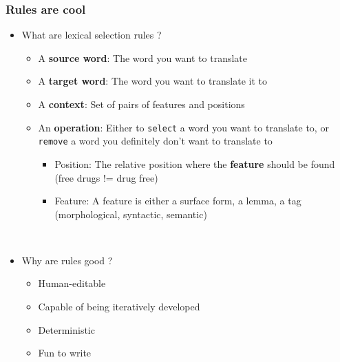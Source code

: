 \documentclass[10pt,xetex]{beamer} %
\begin{document}
\begin{frame}
\frametitle{Rules are cool}

\begin{itemize}
  \item What are lexical selection rules ?
  \begin{itemize}
    \item A {\bf source word}: The word you want to translate
    \item A {\bf target word}: The word you want to translate it to
    \item A {\bf context}: Set of pairs of features and positions
    \item An {\bf operation}: Either to {\tt select} a word you want to translate to, or {\tt remove} a word you definitely don't want to translate to
    \begin{itemize}
      \item  Position: The relative position where the {\bf feature} should be found (free drugs != drug free)
      \item  Feature: A feature is either a surface form, a lemma, a tag (morphological, syntactic, semantic)
    \end{itemize}
  \end{itemize}
~\\

  \item Why are rules good ?
  \begin{itemize}
    \item Human-editable
    \item Capable of being iteratively developed
    \item Deterministic
    \item Fun to write
  \end{itemize}
\end{itemize}

\end{frame}
\end{document}
